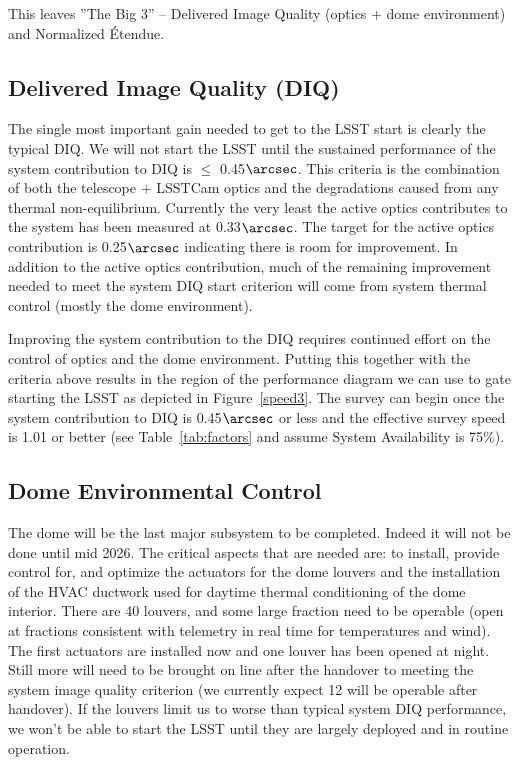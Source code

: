 This leaves ''The Big 3'' -- Delivered Image Quality (optics + dome environment) and Normalized \'{E}tendue.

\subsection{Delivered Image Quality (DIQ)}

The single most important gain needed to get to the LSST start is clearly the typical DIQ.  We will not start the LSST until the sustained performance of the system contribution to DIQ is $\le$ 0.45$\arcsec$.  This criteria is the combination of both the telescope + LSSTCam optics and the degradations caused from any thermal non-equilibrium. Currently the very least the active optics contributes to the system has been measured at 0.33$\arcsec$.  The target for the active optics contribution is 0.25$\arcsec$ indicating there is room for improvement.  In addition to the active optics contribution, much of the remaining improvement needed to meet the system DIQ start criterion will come from system thermal control (mostly the dome environment).

Improving the system contribution to the DIQ requires continued effort on the control of optics and the dome environment. Putting this together with the criteria above results in the region of the performance diagram we can use to gate starting the LSST as depicted in Figure~\ref{speed3}. The survey can begin once the system contribution to DIQ is 0.45$\arcsec$ or less and the effective survey speed is 1.01 or better (see Table~\ref{tab:factors} and assume System Availability is 75$\%$).

\subsection{Dome Environmental Control}
The dome will be the last major subsystem to be completed. Indeed it will not be done until mid 2026. The critical aspects that are needed are: to install, provide control for, and optimize the actuators for the dome louvers and the installation of the HVAC ductwork used for daytime thermal conditioning of the dome interior. There are 40 louvers, and some large fraction need to be operable (open at fractions consistent with telemetry in real time for temperatures and wind). The first actuators are installed now and one louver has been opened at night. Still more will need to be brought on line after the handover to meeting the system image quality criterion (we currently expect 12 will be operable after handover). If the louvers limit us to worse than typical system DIQ performance, we won't be able to start the LSST until they are largely deployed and in routine operation. 

